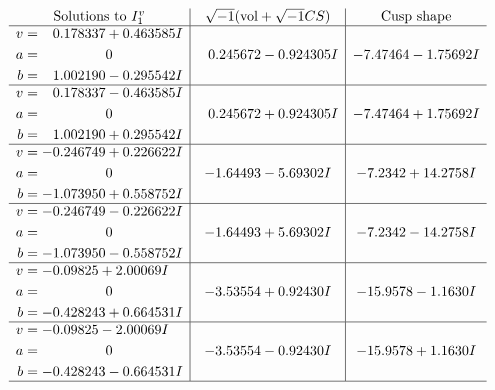 \documentclass[1p]{elsarticle_modified}
\theoremstyle{definition}
\newcommand{\I}{\sqrt{-1}}
\begin{document}
$$\begin{array}{c|c|c}  
\text{Solutions to }I^v_{1}& \I (\text{vol} + \sqrt{-1}CS) & \text{Cusp shape}\\
 \hline 
\begin{aligned}
v &= \phantom{-}0.178337 + 0.463585 I \\
a &= \phantom{-0.000000 } 0 \\
b &= \phantom{-}1.002190 - 0.295542 I\end{aligned}
 & \phantom{-}0.245672 - 0.924305 I & -7.47464 - 1.75692 I \\ \hline\begin{aligned}
v &= \phantom{-}0.178337 - 0.463585 I \\
a &= \phantom{-0.000000 } 0 \\
b &= \phantom{-}1.002190 + 0.295542 I\end{aligned}
 & \phantom{-}0.245672 + 0.924305 I & -7.47464 + 1.75692 I \\ \hline\begin{aligned}
v &= -0.246749 + 0.226622 I \\
a &= \phantom{-0.000000 } 0 \\
b &= -1.073950 + 0.558752 I\end{aligned}
 & -1.64493 - 5.69302 I & -7.2342 + 14.2758 I \\ \hline\begin{aligned}
v &= -0.246749 - 0.226622 I \\
a &= \phantom{-0.000000 } 0 \\
b &= -1.073950 - 0.558752 I\end{aligned}
 & -1.64493 + 5.69302 I & -7.2342 - 14.2758 I \\ \hline\begin{aligned}
v &= -0.09825 + 2.00069 I \\
a &= \phantom{-0.000000 } 0 \\
b &= -0.428243 + 0.664531 I\end{aligned}
 & -3.53554 + 0.92430 I & -15.9578 - 1.1630 I \\ \hline\begin{aligned}
v &= -0.09825 - 2.00069 I \\
a &= \phantom{-0.000000 } 0 \\
b &= -0.428243 - 0.664531 I\end{aligned}
 & -3.53554 - 0.92430 I & -15.9578 + 1.1630 I\\
 \hline 
 \end{array}$$\newpage
\newpage\renewcommand{\arraystretch}{1}
\end{document}
